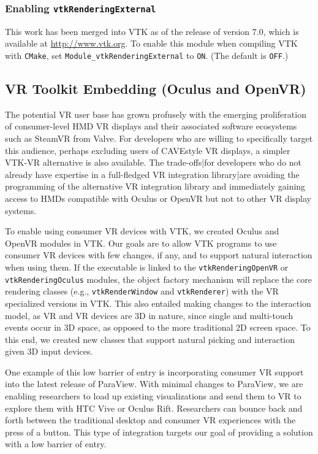 \subsubsection{Enabling \texttt{vtkRenderingExternal}}

This work has been merged into VTK as of the release of version 7.0, which is available at
\url{http://www.vtk.org}.
To enable this module when compiling VTK with \texttt{CMake},
set \texttt{Module\_vtkRenderingExternal} to \texttt{ON}. (The default is \texttt{OFF}.)

\subsection{VR Toolkit Embedding (Oculus and OpenVR)}

The potential VR user base has grown profusely with the emerging
proliferation of consumer-level HMD VR displays and their associated
software ecosystems such as SteamVR from Valve.
For developers who are willing to specifically target this audience, perhaps
excluding users of CAVE\texttrademark\thinspace style VR displays, a simpler VTK-VR alternative is
also available.
The trade-offs|for developers who do not already have expertise in a
full-fledged VR integration library|are avoiding the programming of
the alternative VR integration library and immediately gaining access
to HMDs compatible with Oculus or OpenVR but not to other VR display systems.

To enable using consumer VR devices with VTK, we created Oculus and OpenVR modules in VTK.
Our goals are to allow VTK programs to use consumer VR devices with few changes, if any, and to support natural interaction when using them.
If the executable is linked to the \texttt{vtkRenderingOpenVR} or \texttt{vtkRenderingOculus} modules, the object factory
mechanism will replace the core rendering classes (e.g.,
\texttt{vtkRenderWindow} and \texttt{vtkRenderer}) with the VR specialized versions in VTK.  This also entailed making changes to the 
interaction model, as VR and VR devices are 3D in nature, since single and multi-touch events occur in 3D space, as 
opposed to the more traditional 2D screen space. To this end, we created new classes that support natural picking and interaction given 3D 
input devices.

One example of this low barrier of entry is incorporating consumer VR support into the latest release of ParaView. With minimal changes to ParaView, we are enabling researchers to load up existing visualizations and send them to VR to explore them with HTC Vive or Oculus Rift. Researchers can bounce back and forth between the traditional desktop and consumer VR experiences with the press of a button. This type of integration targets our goal of providing a solution with a low barrier of entry.

